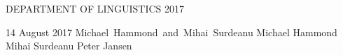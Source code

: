 \documentclass[dissertation,CC-BY-ND]{uathesis}
\begin{document}
\maketitlepage
{DEPARTMENT OF LINGUISTICS}	%
{2017}							

\approval
{14 August 2017}		%
{\mbox{Michael Hammond and Mihai Surdeanu}}		%
{}		%
{Michael Hammond}		%
{Mihai Surdeanu}		%
{Peter Jansen}		    %
{} %

\statementbyauthor


%
%
\tableofcontents
%
\listoffigures
%
\listoftables
%










\renewcommand{\baselinestretch}{1}		%
\small\normalsize										%



\end{document}

